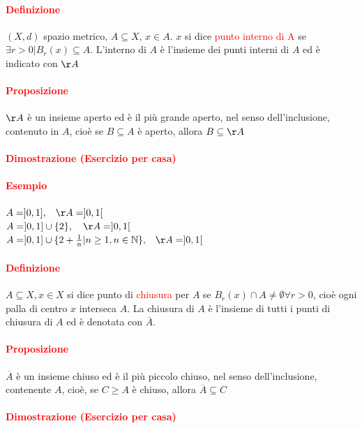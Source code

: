 \documentclass{article}
\newcommand{\N}{\mathbb{N}}
\begin{document}
\paragraph{\textcolor{red}{Definizione}}
$(X,d)$ spazio metrico, $A \subseteq X$, $x \in A$. $x$ si dice \textcolor{red}{punto interno di A} se $\exists r>0 |B_r(x)\subseteq A$. L'interno di $A$ è l'insieme dei punti interni di $A$ ed è indicato con $\AA$

\paragraph{\textcolor{red}{Proposizione}}
$\AA$ è un insieme aperto ed è il più grande aperto, nel senso dell'inclusione, contenuto in $A$, cioè se $B \subseteq A$ è aperto, allora $B \subseteq \AA$

\paragraph{\textcolor{red}{Dimostrazione (Esercizio per casa)}}

\paragraph{\textcolor{red}{Esempio}} 
$A=]0,1], \,\,\,\,\, \AA =]0,1[$\\
$A=]0,1] \cup \{2\}, \,\,\,\,\,\, \AA =]0,1[$\\
$A=]0,1]\cup \{2+\frac{1}{n}|n \geq 1, n \in \N\},\,\,\,\,\,\AA = ]0,1[$

\paragraph{\textcolor{red}{Definizione}}
$A \subseteq X, x \in X$ si dice punto di \textcolor{red}{chiusura} per $A$ se $B_r(x) \cap A \neq \emptyset \forall r>0$, cioè ogni palla di centro $x$ interseca $A$. La chiusura di $A$ è l'insieme di tutti i punti di chiusura di $A$ ed è denotata con $\overline{A}$.

\paragraph{\textcolor{red}{Proposizione}}
$\overline{A} $ è un insieme chiuso ed è il più piccolo chiuso, nel senso dell'inclusione, contenente $A$, cioè, se $C \geq A$ è chiuso, allora $\overline{A}\subseteq C$

\paragraph{\textcolor{red}{Dimostrazione (Esercizio per casa)}}
\end{document}
